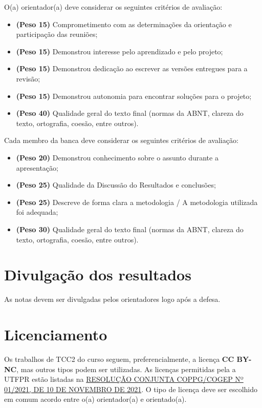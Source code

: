 \documentclass[a4paper, 12pt]{article}
\begin{document}
	O(a) orientador(a) deve considerar os seguintes critérios de avaliação:
	
	\begin{itemize}
		\item \textbf{(Peso 15)} Comprometimento com as determinações da orientação e participação das reuniões;
		\item \textbf{(Peso 15)} Demonstrou interesse pelo aprendizado e pelo projeto;
		\item \textbf{(Peso 15)} Demonstrou dedicação ao escrever as versões entregues para a revisão;
		\item \textbf{(Peso 15)} Demonstrou autonomia para encontrar soluções para o projeto;
		\item \textbf{(Peso 40)} Qualidade geral do texto final (normas da ABNT, clareza do texto, ortografia, coesão, entre outros).
	\end{itemize}

	Cada membro da banca deve considerar os seguintes critérios de avaliação:
	
	\begin{itemize}
		\item \textbf{(Peso 20)} Demonstrou conhecimento sobre o assunto durante a apresentação;
		\item \textbf{(Peso 25)} Qualidade da Discussão do Resultados e conclusões;
		\item \textbf{(Peso 25)} Descreve de forma clara a metodologia / A metodologia utilizada foi adequada;
		\item \textbf{(Peso 30)} Qualidade geral do texto final (normas da ABNT, clareza do texto, ortografia, coesão, entre outros).
	\end{itemize}

	\section{Divulgação dos resultados}
	
	As notas devem ser divulgadas pelos orientadores logo após a defesa.
	
	\section{Licenciamento}
	
	Os trabalhos de TCC2 do curso seguem, preferencialmente, a licença \textbf{CC BY-NC}, mas outros tipos podem ser utilizadas. As licenças permitidas pela a UTFPR estão listadas na \href{https://sei.utfpr.edu.br/sei/publicacoes/controlador_publicacoes.php?acao=publicacao_visualizar&id_documento=2615190&id_orgao_publicacao=0}{RESOLUÇÃO CONJUNTA COPPG/COGEP Nº 01/2021, DE 10 DE NOVEMBRO DE 2021}. O tipo de licença deve ser escolhido em comum acordo entre o(a) orientador(a) e orientado(a).
	
\end{document}
